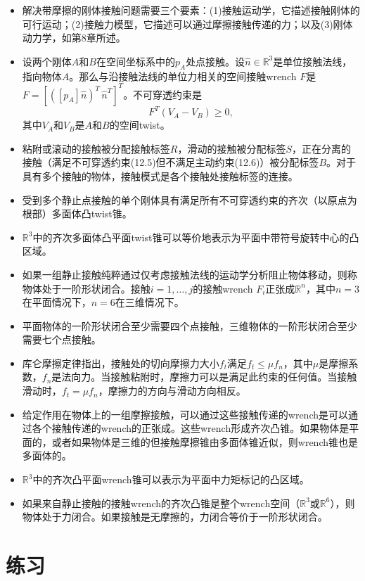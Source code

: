 \documentclass[12pt,a4paper]{article}
\begin{document}
\begin{itemize}
\item 解决带摩擦的刚体接触问题需要三个要素：(1)接触运动学，它描述接触刚体的可行运动；(2)接触力模型，它描述可以通过摩擦接触传递的力；以及(3)刚体动力学，如第8章所述。
\item 设两个刚体$A$和$B$在空间坐标系中的$p_A$处点接触。设$\hat{n} \in \mathbb{R}^3$是单位接触法线，指向物体$A$。那么与沿接触法线的单位力相关的空间接触wrench $F$是$F = [([p_A]\hat{n})^T \, \hat{n}^T]^T$。不可穿透约束是
\begin{equation}
F^T (V_A - V_B) \geq 0,
\end{equation}
其中$V_A$和$V_B$是$A$和$B$的空间twist。
\item 粘附或滚动的接触被分配接触标签$R$，滑动的接触被分配标签$S$，正在分离的接触（满足不可穿透约束(12.5)但不满足主动约束(12.6)）被分配标签$B$。对于具有多个接触的物体，接触模式是各个接触处接触标签的连接。
\item 受到多个静止点接触的单个刚体具有满足所有不可穿透约束的齐次（以原点为根部）多面体凸twist锥。
\item $\mathbb{R}^3$中的齐次多面体凸平面twist锥可以等价地表示为平面中带符号旋转中心的凸区域。
\item 如果一组静止接触纯粹通过仅考虑接触法线的运动学分析阻止物体移动，则称物体处于一阶形状闭合。接触$i = 1, \ldots, j$的接触wrench $F_i$正张成$\mathbb{R}^n$，其中$n = 3$在平面情况下，$n = 6$在三维情况下。
\item 平面物体的一阶形状闭合至少需要四个点接触，三维物体的一阶形状闭合至少需要七个点接触。
\item 库仑摩擦定律指出，接触处的切向摩擦力大小$f_t$满足$f_t \leq \mu f_n$，其中$\mu$是摩擦系数，$f_n$是法向力。当接触粘附时，摩擦力可以是满足此约束的任何值。当接触滑动时，$f_t = \mu f_n$，摩擦力的方向与滑动方向相反。
\item 给定作用在物体上的一组摩擦接触，可以通过这些接触传递的wrench是可以通过各个接触传递的wrench的正张成。这些wrench形成齐次凸锥。如果物体是平面的，或者如果物体是三维的但接触摩擦锥由多面体锥近似，则wrench锥也是多面体的。
\item $\mathbb{R}^3$中的齐次凸平面wrench锥可以表示为平面中力矩标记的凸区域。
\item 如果来自静止接触的接触wrench的齐次凸锥是整个wrench空间（$\mathbb{R}^3$或$\mathbb{R}^6$），则物体处于力闭合。如果接触是无摩擦的，力闭合等价于一阶形状闭合。
\end{itemize}

\section{练习}
\label{sec:exercises}
\end{document}
